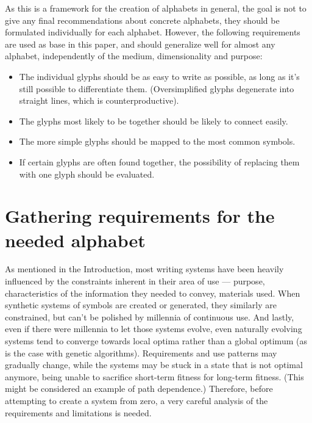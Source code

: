 \documentclass{vgtc}                          %
\begin{document}
As this is a framework for the creation of alphabets in general, the goal is not to give any final recommendations about concrete alphabets, they should be formulated individually for each alphabet. However, the following requirements are used as base in this paper, and should generalize well for almost any alphabet, independently of the medium, dimensionality and purpose:
\begin{itemize}
        \item The individual glyphs should be as easy to write as possible, as long as it's still possible to differentiate them. (Oversimplified glyphs degenerate into straight lines, which is counterproductive).
        \item The glyphs most likely to be together should be likely to connect easily.
        \item The more simple glyphs should be mapped to the most common symbols.
        \item If certain glyphs are often found together, the possibility of replacing them with one glyph should be evaluated.
\end{itemize}

\section{Gathering requirements for the needed alphabet}


As mentioned in the Introduction, most writing systems have been heavily influenced by the constraints inherent in their area of use --- purpose, characteristics of the information they needed to convey, materials used. When synthetic systems of symbols are created or generated, they similarly are constrained, but can't be polished by millennia of continuous use. And lastly, even if there were millennia to let those systems evolve, even naturally evolving systems tend to converge towards local optima rather than a global optimum (as is the case with genetic algorithms). Requirements and use patterns may gradually change, while the systems may be stuck in a state that is not optimal anymore, being unable to sacrifice short-term fitness for long-term fitness. (This might be considered an example of path dependence.) Therefore, before attempting to create a system from zero, a very careful analysis of the requirements and limitations is needed.
\end{document}

